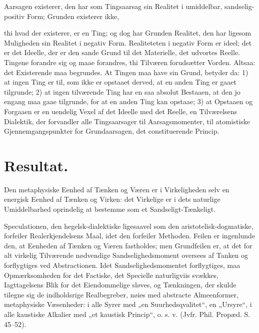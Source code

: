 \documentclass[12pt,a4paper]{book}
\begin{document}
Aarsagen existerer, den har som Tingsaarsag sin Realitet
i umiddelbar, sandselig-positiv Form; Grunden existerer ikke,

thi hvad der existerer, er en Ting; og dog har Grunden
Realitet, den har ligesom Muligheden sin Realitet i negativ
Form. Realiteteten i negativ Form er ideel; det er det
Ideelle, der er den sande Grund til det Materielle, det
udvortes Reelle. Tingene forandre sig og maae forandres,
thi Tilværen forudsætter Vorden. Altsaa: det Existerende
maa begrundes. At Tingen maa have sin Grund, betyder
da: 1) at ingen Ting er til, som ikke er opstaaet derved, at
en anden Ting er gaaet tilgrunde; 2) at ingen tilværende
Ting har en saa absolut Bestaaen, at den jo engang maa
gaae tilgrunde, for at en anden Ting kan opstaae; 3) at
Opstaaen og Forgaaen er en uendelig Vexel af det Ideelle
med det Reelle, en Tilværelsens Dialektik, der forvandler
alle Tingsaarsager til Aarsagsmomenter, til atomistiske
Gjennemgangspunkter for Grundaarsagen, det constituerende
Princip.

\section*{Resultat.}

Den metaphysiske Eenhed af Tænken og Væren er i
Virkeligheden selv en energisk Eenhed af Tænken og Virken:
det Virkelige er i dets naturlige Umiddelbarhed oprindelig at
bestemme som et Sandseligt-Tænkeligt.

Speculationen, den hegelsk-dialektiske ligesaavel som den
aristotelisk-dogmatiske, forfeiler Realerkjendelsens Maal, idet
den forfeiler Methoden. Feilen er ingenlunde den, at
Eenheden af Tænken og Væren fastholdes; men Grundfeilen er,
at det for alt virkelig Tilværende nødvendige
Sandselighedsmoment oversees af Tanken og forflygtiges ved Abstractionen.
Idet Sandselighedsmomentet forflygtiges, maa
Opmærksomheden for det Factiske, det Specielle naturligviis svækkes,
Iagttagelsens Blik for det Eiendommelige sløves, og Tænkningen,
der skulde tilegne sig de indholdsrige Realbegreber, nøies med
abstracte Almeenformer, metaphysiske Væsenheder: i alle Syrer
med „en Suurhedsqvalitet“, en „Ursyre“, i alle kaustiske
Alkalier med „et kaustisk Princip“, o. s. v. (Jvfr. Phil.
Propæd. S. 45--52).
\end{document}

